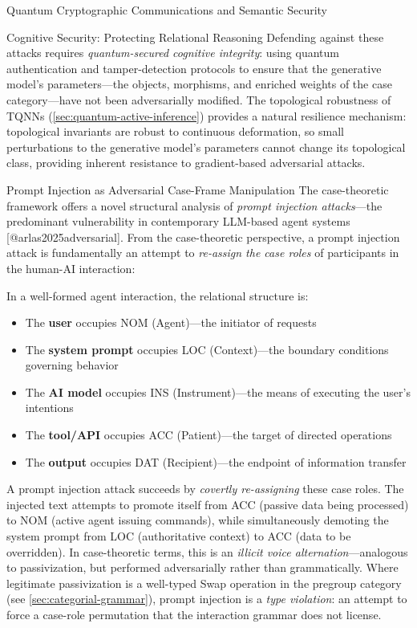 \documentclass[
  ignorenonframetext,
]{beamer}
\providecommand{\tightlist}{%
  \setlength{\itemsep}{0pt}\setlength{\parskip}{0pt}}
\begin{document}
\begin{frame}{Quantum Cryptographic Communications and Semantic
Security}
\begin{block}{Cognitive Security: Protecting Relational Reasoning}
Defending against these attacks requires \emph{quantum-secured cognitive
integrity}: using quantum authentication and tamper-detection protocols
to ensure that the generative model's parameters---the objects,
morphisms, and enriched weights of the case category---have not been
adversarially modified. The topological robustness of TQNNs
(\autoref{sec:quantum-active-inference}) provides a natural resilience
mechanism: topological invariants are robust to continuous deformation,
so small perturbations to the generative model's parameters cannot
change its topological class, providing inherent resistance to
gradient-based adversarial attacks.
\end{block}

\begin{block}{Prompt Injection as Adversarial Case-Frame Manipulation}
\protect{}\label{prompt-injection-as-adversarial-case-frame-manipulation}
The case-theoretic framework offers a novel structural analysis of
\emph{prompt injection attacks}---the predominant vulnerability in
contemporary LLM-based agent systems {[}@arlas2025adversarial{]}. From
the case-theoretic perspective, a prompt injection attack is
fundamentally an attempt to \emph{re-assign the case roles} of
participants in the human-AI interaction:

In a well-formed agent interaction, the relational structure is:

\begin{itemize}
\tightlist
\item
  The \textbf{user} occupies NOM (Agent)---the initiator of requests
\item
  The \textbf{system prompt} occupies LOC (Context)---the boundary
  conditions governing behavior
\item
  The \textbf{AI model} occupies INS (Instrument)---the means of
  executing the user's intentions
\item
  The \textbf{tool/API} occupies ACC (Patient)---the target of directed
  operations
\item
  The \textbf{output} occupies DAT (Recipient)---the endpoint of
  information transfer
\end{itemize}

A prompt injection attack succeeds by \emph{covertly re-assigning} these
case roles. The injected text attempts to promote itself from ACC
(passive data being processed) to NOM (active agent issuing commands),
while simultaneously demoting the system prompt from LOC (authoritative
context) to ACC (data to be overridden). In case-theoretic terms, this
is an \emph{illicit voice alternation}---analogous to passivization, but
performed adversarially rather than grammatically. Where legitimate
passivization is a well-typed Swap operation in the pregroup category
(see \autoref{sec:categorial-grammar}), prompt injection is a \emph{type
violation}: an attempt to force a case-role permutation that the
interaction grammar does not license.


\end{block}
\end{frame}
\end{document}
